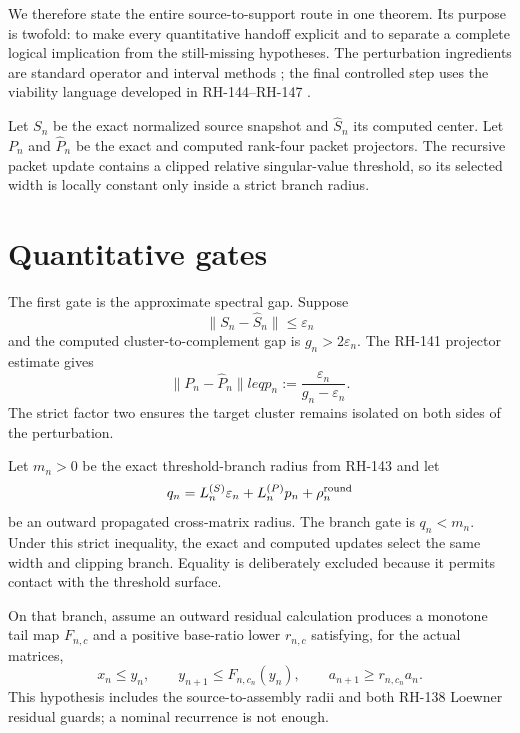\documentclass[12pt]{article}
\begin{document}
We therefore state the entire source-to-support route in one theorem.  Its
purpose is twofold: to make every quantitative handoff explicit and to
separate a complete logical implication from the still-missing hypotheses.
The perturbation ingredients are standard operator and interval methods
\citep{Kato1995,Bhatia2007,Moore1966}; the final controlled step uses the
viability language developed in RH-144--RH-147 \citep{Aubin1991}.

Let $S_n$ be the exact normalized source snapshot and $\widehat S_n$ its
computed center.  Let $P_n$ and $\widehat P_n$ be the exact and computed
rank-four packet projectors.  The recursive packet update contains a clipped
relative singular-value threshold, so its selected width is locally constant
only inside a strict branch radius.

\section{Quantitative gates}
The first gate is the approximate spectral gap.  Suppose
\begin{equation}\label{eq:source}
 \|S_n-\widehat S_n\|\leq\varepsilon_n
\end{equation}
and the computed cluster-to-complement gap is $g_n>2\varepsilon_n$.  The
RH-141 projector estimate gives
\begin{equation}\label{eq:packet}
 \|P_n-\widehat P_n\|leq
 p_n:=\frac{\varepsilon_n}{g_n-\varepsilon_n}.
\end{equation}
The strict factor two ensures the target cluster remains isolated on both
sides of the perturbation.

Let $m_n>0$ be the exact threshold-branch radius from RH-143 and let
\begin{equation}\label{eq:branch}
 q_n=L_n^{(S)}\varepsilon_n+L_n^{(P)}p_n+\rho_n^{\rm round}
\end{equation}
be an outward propagated cross-matrix radius.  The branch gate is
$q_n<m_n$.  Under this strict inequality, the exact and computed updates
select the same width and clipping branch.  Equality is deliberately
excluded because it permits contact with the threshold surface.

On that branch, assume an outward residual calculation produces a monotone
tail map $F_{n,c}$ and a positive base-ratio lower $r_{n,c}$ satisfying, for
the actual matrices,
\begin{equation}\label{eq:outward}
 x_n\leq y_n,
 \qquad
 y_{n+1}\leq F_{n,c_n}(y_n),
 \qquad
 a_{n+1}\geq r_{n,c_n}a_n.
\end{equation}
This hypothesis includes the source-to-assembly radii and both RH-138 Loewner
residual guards; a nominal recurrence is not enough.
\end{document}
